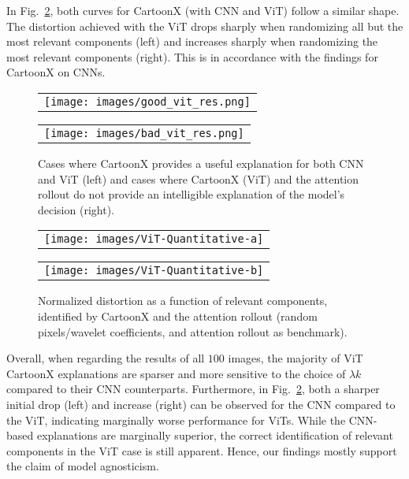 In Fig.~\ref{fig:ViT-Quantitative}, both curves for CartoonX (with CNN and ViT) follow a similar shape.
The distortion achieved with the ViT drops sharply when randomizing all but the most relevant components (left) and increases sharply when randomizing the most relevant components (right).
This is in accordance with the findings for CartoonX on CNNs.

\begin{figure}
    \begin{tabular}{@{}c@{}}
        \texttt{[image: images/good\_vit\_res.png]}
    \end{tabular}
    \begin{tabular}{@{}c@{}}
        \texttt{[image: images/bad\_vit\_res.png]}
    \end{tabular}
    \caption{Cases where CartoonX provides a useful explanation for both CNN and ViT (left) and cases where CartoonX (ViT) and the attention rollout do not provide an intelligible explanation of the model's decision (right).}
    \label{fig:vit_res}
\end{figure}

\begin{figure}[htb]
    \centering
    \begin{tabular}{@{}c@{}}
        \texttt{[image: images/ViT-Quantitative-a]}
    \end{tabular}
    \begin{tabular}{@{}c@{}}
        \texttt{[image: images/ViT-Quantitative-b]}
    \end{tabular}
    \caption{Normalized distortion as a function of relevant components, identified by CartoonX and the attention rollout (random pixels/wavelet coefficients, and attention rollout as benchmark).}
    \label{fig:ViT-Quantitative}
\end{figure}

Overall, when regarding the results of all $100$ images, the majority of ViT CartoonX explanations are sparser and more sensitive to the choice of $\lambda k$ compared to their CNN counterparts.
Furthermore, in Fig.~\ref{fig:ViT-Quantitative}, both a sharper initial drop (left) and increase (right) can be observed for the CNN compared to the ViT, indicating marginally worse performance for ViTs.
While the CNN-based explanations are marginally superior, the correct identification of relevant components in the ViT case is still apparent.
Hence, our findings mostly support the claim of model agnosticism.
 

